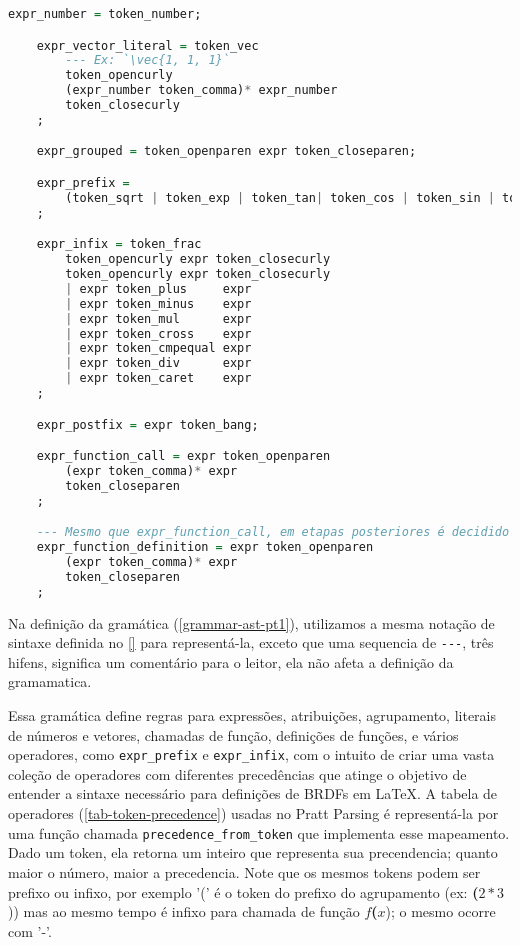 \begin{codigo}[H]
        \caption{\small Gramática para \texttt{EquantionLang} parte 2.}
        \label{grammar-ast-pt2}
\begin{lstlisting}[language=haskell, numbers=none, inputencoding=utf8]
    expr_number = token_number;

    expr_vector_literal = token_vec
        --- Ex: `\vec{1, 1, 1}`
        token_opencurly
        (expr_number token_comma)* expr_number
        token_closecurly
    ;

    expr_grouped = token_openparen expr token_closeparen;

    expr_prefix =
        (token_sqrt | token_exp | token_tan| token_cos | token_sin | token_arctan | token_arccos | token_arcsin | token_minus | token_plus) expr
    ;

    expr_infix = token_frac
        token_opencurly expr token_closecurly
        token_opencurly expr token_closecurly
        | expr token_plus     expr
        | expr token_minus    expr
        | expr token_mul      expr
        | expr token_cross    expr
        | expr token_cmpequal expr
        | expr token_div      expr
        | expr token_caret    expr
    ;

    expr_postfix = expr token_bang;

    expr_function_call = expr token_openparen
        (expr token_comma)* expr
        token_closeparen
    ;

    --- Mesmo que expr_function_call, em etapas posteriores é decidido qual tipo realmente é.
    expr_function_definition = expr token_openparen
        (expr token_comma)* expr
        token_closeparen
    ;
\end{lstlisting}
\end{codigo}

Na definição da gramática (\autoref{grammar-ast-pt1}), utilizamos a mesma notação de sintaxe definida no \autoref{} para representá-la, exceto que uma sequencia de \verb"---", três hifens, significa um comentário para o leitor, ela não afeta a definição da gramamatica.

Essa gramática define regras para expressões, atribuições, agrupamento, literais de números e vetores, chamadas de função, definições de funções, e vários operadores, como \texttt{expr\_prefix} e \texttt{expr\_infix}, com o intuito de criar uma vasta coleção de operadores com diferentes precedências que atinge o objetivo de entender a sintaxe necessário para definições de BRDFs em \LaTeX{}. A tabela de operadores (\autoref{tab-token-precedence}) usadas no Pratt Parsing é representá-la por uma função chamada \texttt{precedence\_from\_token} que implementa esse mapeamento. Dado um token, ela retorna um inteiro que representa sua precendencia; quanto maior o número, maior a precedencia. Note que os mesmos tokens podem ser prefixo ou infixo, por exemplo '(' é o token do prefixo do agrupamento (ex: \textbf{(}$2*3$)) mas ao mesmo tempo é infixo para chamada de função $f$\textbf{(}$x$); o mesmo ocorre com '-'.

